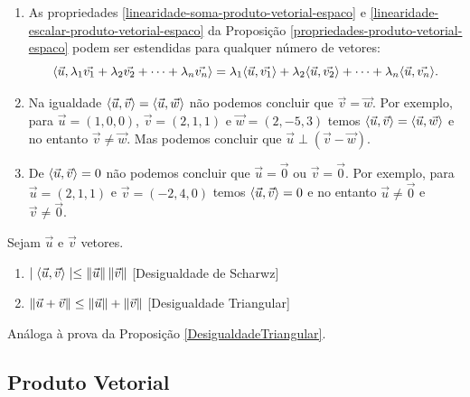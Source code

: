 \begin{observacao}
    \begin{enumerate}[label=({\alph*})]
        \item As propriedades \ref{linearidade-soma-produto-vetorial-espaco} e \ref{linearidade-escalar-produto-vetorial-espaco} da Proposição \ref{propriedades-produto-vetorial-espaco} podem ser estendidas para qualquer número de vetores:
              \[
                  \langle\vec{u}, \lambda_1\vec{v_1} + \lambda_2\vec{v_2} + \cdots + \lambda_n\vec{v_n}\rangle = \lambda_1\langle \vec{u}, \vec{v_1} \rangle + \lambda_2\langle \vec{u}, \vec{v_2} \rangle + \cdots + \lambda_n\langle \vec{u}, \vec{v_n} \rangle.
              \]
        \item Na igualdade $\langle \vec{u}, \vec{v} \rangle = \langle \vec{u}, \vec{w} \rangle$ não podemos concluir que $\vec{v} = \vec{w}$. Por exemplo, para $\vec{u} = (1, 0, 0)$, $\vec{v} = (2, 1, 1)$ e $\vec{w} = (2, -5, 3)$ temos $\langle \vec{u}, \vec{v} \rangle = \langle \vec{u}, \vec{w} \rangle$ e no entanto $\vec{v} \ne \vec{w}$. Mas podemos concluir que $\vec{u}\perp(\vec{v} - \vec{w})$.
        \item De $\langle \vec{u}, \vec{v} \rangle = 0$ não podemos concluir que $\vec{u} = \vec{0}$ ou $\vec{v} = \vec{0}$. Por exemplo, para $\vec{u} = (2, 1, 1)$ e $\vec{v} = (-2, 4, 0)$ temos $\langle \vec{u}, \vec{v} \rangle = 0$ e no entanto $\vec{u} \ne \vec{0}$ e $\vec{v} \ne \vec{0}$.
    \end{enumerate}
\end{observacao}

\begin{proposicao}Sejam $\vec{u}$ e $\vec{v}$ vetores.
    \begin{enumerate}
        \item $\mid\langle \vec{u}, \vec{v} \rangle\mid \le \left\Vert{\vec{u}}\right\Vert\left\Vert{\vec{v}}\right\Vert$ [Desigualdade de Scharwz]
        \item $\left\Vert{\vec{u} + \vec{v}}\right\Vert \le \left\Vert{\vec{u}}\right\Vert + \left\Vert{\vec{v}}\right\Vert$ [Desigualdade Triangular]
    \end{enumerate}
\end{proposicao}
\begin{prova}
    Análoga à prova da Proposição \ref{DesigualdadeTriangular}.
\end{prova}

\subsection{Produto Vetorial}

